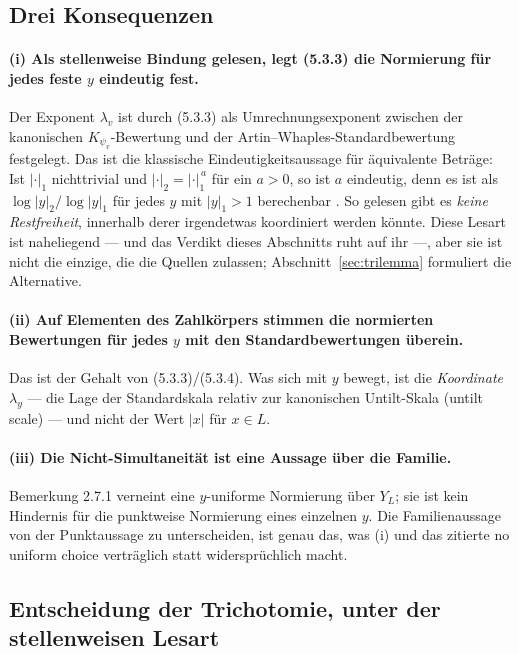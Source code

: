 \documentclass[11pt,a4paper]{article}
\theoremstyle{definition}
\theoremstyle{plain}
\theoremstyle{definition}
\newcommand{\Ynum}{Y_L}
\begin{document}
\subsection{Drei Konsequenzen}

\paragraph{(i) Als stellenweise Bindung gelesen, legt (5.3.3) die Normierung für
jedes feste $y$ eindeutig fest.}
Der Exponent $\lambda_v$ ist durch (5.3.3) als Umrechnungsexponent zwischen der
kanonischen $K_{\psi_v}$-Bewertung und der Artin--Whaples-Standardbewertung
festgelegt. Das ist die klassische Eindeutigkeitsaussage für äquivalente Beträge:
Ist $|\cdot|_1$ nichttrivial und $|\cdot|_2 = |\cdot|_1^{\,a}$ für ein $a > 0$, so
ist $a$ eindeutig, denn es ist als $\log|y|_2/\log|y|_1$ für jedes $y$ mit
$|y|_1 > 1$ berechenbar \cite[Prop.~7.8, S.~108]{Milne2020}. So gelesen gibt es
\emph{keine Restfreiheit}, innerhalb derer irgendetwas \glqq koordiniert\grqq{}
werden könnte. Diese Lesart ist naheliegend --- und das Verdikt dieses Abschnitts
ruht auf ihr ---, aber sie ist nicht die einzige, die die Quellen zulassen;
Abschnitt~\ref{sec:trilemma} formuliert die Alternative.

\paragraph{(ii) Auf Elementen des Zahlkörpers stimmen die normierten Bewertungen
für jedes $y$ mit den Standardbewertungen überein.}
Das ist der Gehalt von (5.3.3)/(5.3.4). Was sich mit $y$ bewegt, ist die
\emph{Koordinate} $\lambda_y$ --- die Lage der Standardskala relativ zur kanonischen
Untilt-Skala (untilt scale) --- und nicht der Wert $|x|$ für $x \in L$.

\paragraph{(iii) Die Nicht-Simultaneität ist eine Aussage über die Familie.}
Bemerkung 2.7.1 verneint eine $y$-uniforme Normierung über $\Ynum$; sie ist kein
Hindernis für die punktweise Normierung eines einzelnen $y$. Die Familienaussage von
der Punktaussage zu unterscheiden, ist genau das, was (i) und das zitierte \glqq no
uniform choice\grqq{} verträglich statt widersprüchlich macht.

\subsection{Entscheidung der Trichotomie, unter der stellenweisen Lesart}
\label{sec:trichotomy}
\end{document}
